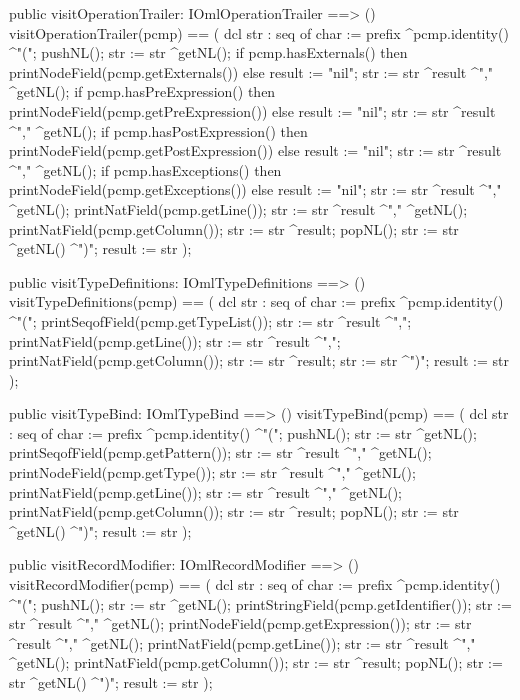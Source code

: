 \begin{vdm_al}
  public visitOperationTrailer: IOmlOperationTrailer ==> ()
  visitOperationTrailer(pcmp) ==
    ( dcl str : seq of char := prefix ^pcmp.identity() ^"(";
      pushNL();
      str := str ^getNL();
      if pcmp.hasExternals()
      then printNodeField(pcmp.getExternals())
      else result := "nil";
      str := str ^result ^"," ^getNL();
      if pcmp.hasPreExpression()
      then printNodeField(pcmp.getPreExpression())
      else result := "nil";
      str := str ^result ^"," ^getNL();
      if pcmp.hasPostExpression()
      then printNodeField(pcmp.getPostExpression())
      else result := "nil";
      str := str ^result ^"," ^getNL();
      if pcmp.hasExceptions()
      then printNodeField(pcmp.getExceptions())
      else result := "nil";
      str := str ^result ^"," ^getNL();
      printNatField(pcmp.getLine());
      str := str ^result ^"," ^getNL();
      printNatField(pcmp.getColumn());
      str := str ^result;
      popNL();
      str := str ^getNL() ^")";
      result := str );

  public visitTypeDefinitions: IOmlTypeDefinitions ==> ()
  visitTypeDefinitions(pcmp) ==
    ( dcl str : seq of char := prefix ^pcmp.identity() ^"(";
      printSeqofField(pcmp.getTypeList());
      str := str ^result ^",";
      printNatField(pcmp.getLine());
      str := str ^result ^",";
      printNatField(pcmp.getColumn());
      str := str ^result;
      str := str ^")";
      result := str );

  public visitTypeBind: IOmlTypeBind ==> ()
  visitTypeBind(pcmp) ==
    ( dcl str : seq of char := prefix ^pcmp.identity() ^"(";
      pushNL();
      str := str ^getNL();
      printSeqofField(pcmp.getPattern());
      str := str ^result ^"," ^getNL();
      printNodeField(pcmp.getType());
      str := str ^result ^"," ^getNL();
      printNatField(pcmp.getLine());
      str := str ^result ^"," ^getNL();
      printNatField(pcmp.getColumn());
      str := str ^result;
      popNL();
      str := str ^getNL() ^")";
      result := str );

  public visitRecordModifier: IOmlRecordModifier ==> ()
  visitRecordModifier(pcmp) ==
    ( dcl str : seq of char := prefix ^pcmp.identity() ^"(";
      pushNL();
      str := str ^getNL();
      printStringField(pcmp.getIdentifier());
      str := str ^result ^"," ^getNL();
      printNodeField(pcmp.getExpression());
      str := str ^result ^"," ^getNL();
      printNatField(pcmp.getLine());
      str := str ^result ^"," ^getNL();
      printNatField(pcmp.getColumn());
      str := str ^result;
      popNL();
      str := str ^getNL() ^")";
      result := str );


\end{vdm_al}
